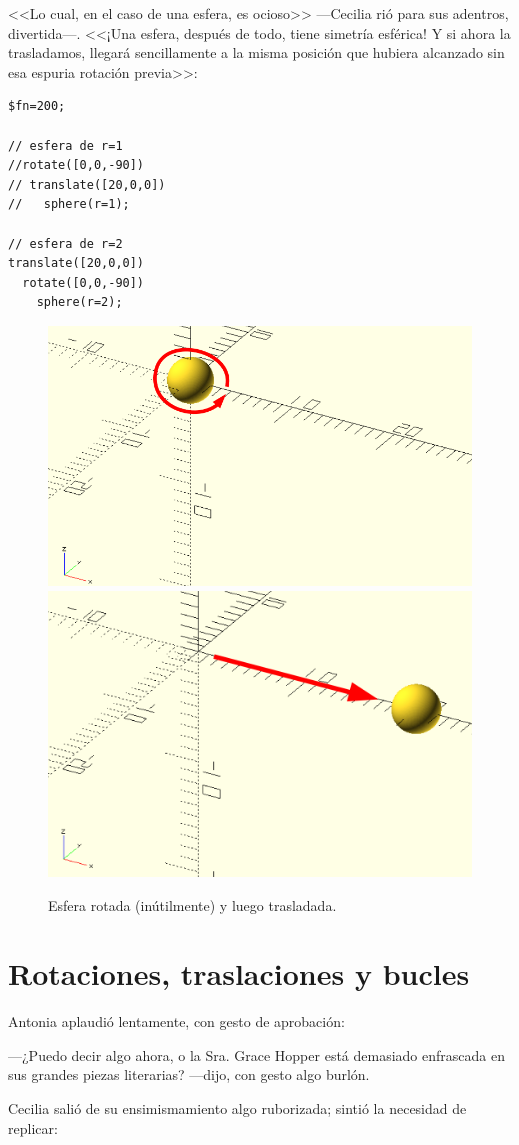     
    <<Lo cual, en el caso de una esfera, es ocioso>> ---Cecilia rió
    para sus adentros, divertida---. <<¡Una esfera, después de todo,
    tiene simetría esférica! Y si ahora la trasladamos, llegará
    sencillamente a la misma posición que hubiera alcanzado sin esa
    espuria rotación previa>>:

\begin{lstlisting}
$fn=200;
      
// esfera de r=1
//rotate([0,0,-90])
// translate([20,0,0])
//   sphere(r=1);
   
// esfera de r=2
translate([20,0,0])
  rotate([0,0,-90])
    sphere(r=2);
    \end{lstlisting}%


    \begin{figure}[ht]
      \centering
      \includegraphics[width=.4\textwidth]{imagenes/esfera-rotada}
      \hspace{.05\textwidth}
      \includegraphics[width=.4\textwidth]{imagenes/esfera-rotada-y-trasladada}      
      \caption{Esfera rotada (inútilmente) y luego trasladada.}
      \label{fig:esfera-rotada-y-trasladada}
    \end{figure}
    
  \section{Rotaciones, traslaciones y bucles}

  Antonia aplaudió lentamente, con gesto de aprobación:

  ---¿Puedo decir algo ahora, o la Sra. Grace Hopper está demasiado
  enfrascada en sus grandes piezas literarias? ---di\-jo, con gesto algo
  burlón.

  Cecilia salió de su ensimismamiento algo ruborizada; sintió la
  necesidad de replicar:

